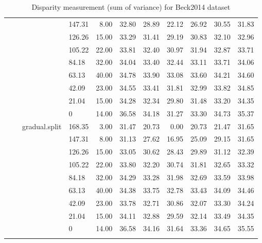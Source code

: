 \begin{longtable}{llllrrrrrrr}
   &  &  & 147.31 & 8.00 & 32.80 & 28.89 & 22.12 & 26.92 & 30.55 & 31.83 \\ 
   &  &  & 126.26 & 15.00 & 33.29 & 31.41 & 29.19 & 30.83 & 32.10 & 32.96 \\ 
   &  &  & 105.22 & 22.00 & 33.81 & 32.40 & 30.97 & 31.94 & 32.87 & 33.71 \\ 
   &  &  & 84.18 & 32.00 & 34.04 & 33.40 & 32.44 & 33.11 & 33.71 & 34.06 \\ 
   &  &  & 63.13 & 40.00 & 34.78 & 33.90 & 33.08 & 33.60 & 34.21 & 34.60 \\ 
   &  &  & 42.09 & 23.00 & 34.55 & 33.41 & 31.81 & 32.99 & 33.82 & 34.85 \\ 
   &  &  & 21.04 & 15.00 & 34.28 & 32.34 & 29.80 & 31.48 & 33.20 & 34.35 \\ 
   &  &  & 0 & 14.00 & 36.58 & 34.18 & 31.27 & 33.30 & 34.73 & 35.37 \\ 
   &  & gradual.split & 168.35 & 3.00 & 31.47 & 20.73 & 0.00 & 20.73 & 21.47 & 31.65 \\ 
   &  &  & 147.31 & 8.00 & 31.13 & 27.62 & 16.95 & 25.09 & 29.15 & 31.65 \\ 
   &  &  & 126.26 & 15.00 & 33.05 & 30.62 & 28.43 & 29.89 & 31.12 & 32.39 \\ 
   &  &  & 105.22 & 22.00 & 33.80 & 32.20 & 30.74 & 31.81 & 32.65 & 33.32 \\ 
   &  &  & 84.18 & 32.00 & 34.29 & 33.28 & 31.98 & 32.69 & 33.59 & 33.98 \\ 
   &  &  & 63.13 & 40.00 & 34.38 & 33.75 & 32.78 & 33.43 & 34.09 & 34.46 \\ 
   &  &  & 42.09 & 23.00 & 33.78 & 32.71 & 30.86 & 32.07 & 33.30 & 34.24 \\ 
   &  &  & 21.04 & 15.00 & 34.11 & 32.88 & 29.59 & 32.14 & 33.49 & 34.35 \\ 
   &  &  & 0 & 14.00 & 36.58 & 34.16 & 31.64 & 33.36 & 34.65 & 35.55 \\ 
   \hline
\hline
\caption{Disparity measurement (sum of variance) for Beck2014 dataset} 
\end{longtable}

